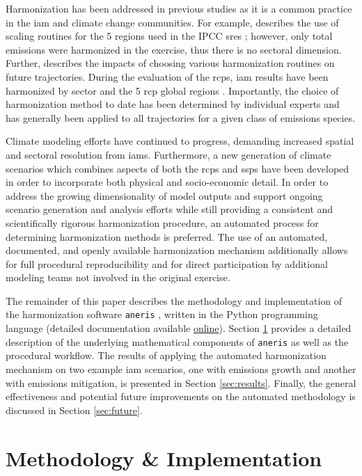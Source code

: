\documentclass[review]{elsarticle}
\newcommand{\code}[1]{\lstinline[basicstyle=\ttfamily\color{black}]|#1|}
\begin{document}
Harmonization has been addressed in previous studies as it is a common practice
in the \gls{iam} and climate change communities. For example,
\cite{meinshausen_rcp_2011} describes the use of scaling routines for the 5
regions used in the IPCC \gls{sres} \cite{nakicenovic2000}; however, only total
emissions were harmonized in the exercise, thus there is no sectoral
dimension. Further, \cite{rogelj_discrepancies_2011} describes the impacts of
choosing various harmonization routines on future trajectories. During the
evaluation of the \glspl{rcp}, \gls{iam}
results have been harmonized by sector and the 5 \gls{rcp} global regions
\cite{vuuren_representative_2011}. Importantly, the choice of harmonization
method to date has been determined by individual experts and has generally been
applied to all trajectories for a given class of emissions species.

Climate modeling efforts have continued to progress, demanding increased spatial
and sectoral resolution from \glspl{iam}. Furthermore, a new generation of climate
scenarios which combines aspects of both the \glspl{rcp} and \glspl{ssp} have been developed
in order to incorporate both physical and socio-economic detail. In order to
address the growing dimensionality of model outputs and support ongoing scenario
generation and analysis efforts while still providing a consistent and
scientifically rigorous harmonization procedure, an automated process for
determining harmonization methods is preferred. The use of an automated,
documented, and openly available harmonization mechanism additionally allows for
full procedural reproducibility and for direct participation by additional
modeling teams not involved in the original exercise.

The remainder of this paper describes the methodology and implementation of the
harmonization software \code{aneris} \cite{matthew_gidden_2017_802832}, written
in the Python programming language (detailed documentation available
\href{http://mattgidden.com/aneris/}{online}). Section \ref{sec:meths} provides
a detailed description of the underlying mathematical components of
\code{aneris} as well as the procedural workflow. The results of applying the
automated harmonization mechanism on two example \gls{iam} scenarios, one with
emissions growth and another with emissions mitigation, is presented in Section
\ref{sec:results}. Finally, the general effectiveness and potential future
improvements on the automated methodology is discussed in Section
\ref{sec:future}.

\section{Methodology \& Implementation}\label{sec:meths}
\end{document}
